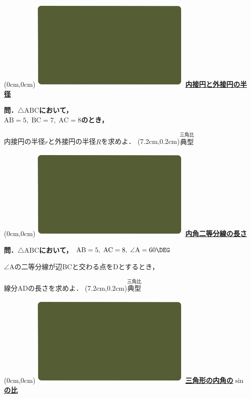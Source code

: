 \documentclass[10pt,
fleqn,
dvipdfmx,
uplatex
]{jsarticle}
\begin{document}
\newpage



\at(0cm,0cm){\includegraphics[width=8cm,bb=0 0 1920 1080]{./youtube/thumbnails/templates/smart_background/三角比.jpeg}}
{\color{orange}\bf\boldmath\LARGE\underline{内接円と外接円の半径}}\vspace{0.3zw}

\large 
\bf\boldmath 問．$\triangle \text{ABC}$において，\\
\hfill $\text{AB}=5,\;\text{BC}=7,\;\text{AC}=8$のとき，

\huge
内接円の半径$r$と外接円の半径$R$を求めよ．
\at(7.2cm,0.2cm){\small\color{bradorange}$\overset{\text{三角比}}{\text{典型}}$}

\newpage

\at(0cm,0cm){\includegraphics[width=8cm,bb=0 0 1920 1080]{./youtube/thumbnails/templates/smart_background/三角比.jpeg}}
{\color{orange}\bf\boldmath\LARGE\underline{内角二等分線の長さ}}\vspace{0.3zw}

\scriptsize 
\bf\boldmath 問．$\triangle \text{ABC}$において，
\small 
$\text{AB}=5,\;\text{AC}=8,\;\angle \text{A}={60}\DEG $

\LARGE
$\angle \text{A}$の二等分線が辺$\text{BC}$と交わる点を$\text{D}$とするとき，

\Large
\hfill 線分$\text{AD}$の長さを求めよ．
\at(7.2cm,0.2cm){\small\color{bradorange}$\overset{\text{三角比}}{\text{典型}}$}

\newpage

\at(0cm,0cm){\includegraphics[width=8cm,bb=0 0 1920 1080]{./youtube/thumbnails/templates/smart_background/三角比.jpeg}}
{\color{orange}\bf\boldmath\Large\underline{三角形の内角の$\sin$の比}}\vspace{0.5zw}
\end{document}
